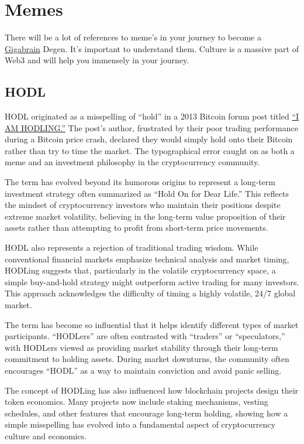 \documentclass[
  letterpaper,
  DIV=11,
  numbers=noendperiod]{scrreprt}
\begin{document}
\chapter{Memes}\label{memes}

There will be a lot of references to meme's in your journey to become a
\hyperref[gigabrain]{Gigabrain} Degen. It's important to understand
them. Culture is a massive part of Web3 and will help you immensely in
your journey.

\section{HODL}\label{hodl}

HODL originated as a misspelling of ``hold'' in a 2013 Bitcoin forum
post titled \href{https://bitcointalk.org/index.php?topic=375643.0}{``I
AM HODLING.''} The post's author, frustrated by their poor trading
performance during a Bitcoin price crash, declared they would simply
hold onto their Bitcoin rather than try to time the market. The
typographical error caught on as both a meme and an investment
philosophy in the cryptocurrency community.

The term has evolved beyond its humorous origins to represent a
long-term investment strategy often summarized as ``Hold On for Dear
Life.'' This reflects the mindset of cryptocurrency investors who
maintain their positions despite extreme market volatility, believing in
the long-term value proposition of their assets rather than attempting
to profit from short-term price movements.

HODL also represents a rejection of traditional trading wisdom. While
conventional financial markets emphasize technical analysis and market
timing, HODLing suggests that, particularly in the volatile
cryptocurrency space, a simple buy-and-hold strategy might outperform
active trading for many investors. This approach acknowledges the
difficulty of timing a highly volatile, 24/7 global market.

The term has become so influential that it helps identify different
types of market participants. ``HODLers'' are often contrasted with
``traders'' or ``speculators,'' with HODLers viewed as providing market
stability through their long-term commitment to holding assets. During
market downturns, the community often encourages ``HODL'' as a way to
maintain conviction and avoid panic selling.

The concept of HODLing has also influenced how blockchain projects
design their token economics. Many projects now include staking
mechanisms, vesting schedules, and other features that encourage
long-term holding, showing how a simple misspelling has evolved into a
fundamental aspect of cryptocurrency culture and economics.
\end{document}
